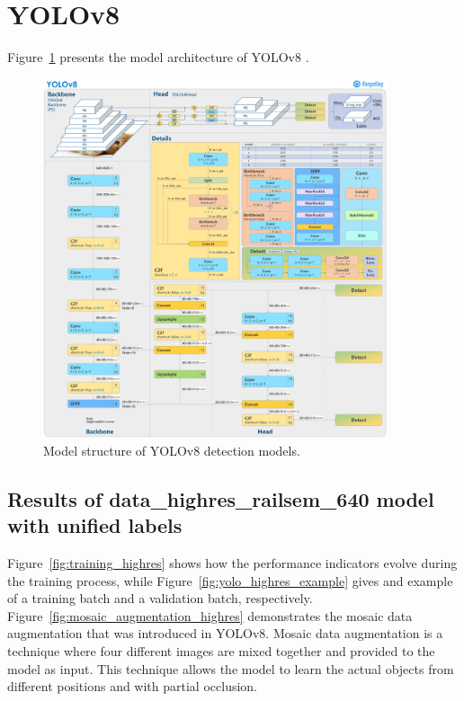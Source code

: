 \documentclass[Master,MDS,english]{BASE/twbook} %
\begin{document}
\section{YOLOv8} \label{app:yolo}

Figure~\ref{fig:yolo_architecture} presents the model architecture of YOLOv8 \citep{RangeKing}.

\begin{figure}[h]
\centering
\includegraphics[width=0.9\textwidth]{images/yolo/architecture}
\caption{Model structure of YOLOv8 detection models. }
\label{fig:yolo_architecture}
\end{figure}

\subsection{Results of data\_highres\_railsem\_640 model with unified labels}

Figure~\ref{fig:training_highres} shows how the performance indicators evolve during the training process, while Figure~\ref{fig:yolo_highres_example} gives and example of a training batch and a validation batch, respectively.
Figure~\ref{fig:mosaic_augmentation_highres} demonstrates the mosaic data augmentation that was introduced in YOLOv8. 
Mosaic data augmentation is a technique where four different images are mixed together and provided to the model as input. This technique allows the model to learn the actual objects from different positions and with partial occlusion. 
\end{document}
